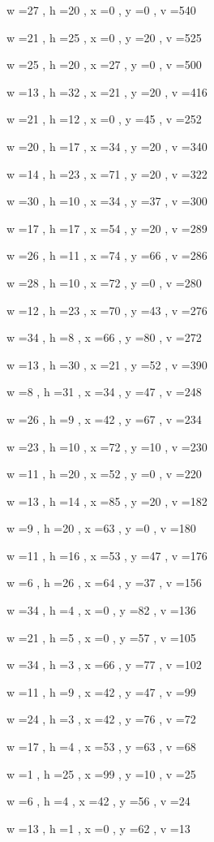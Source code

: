 \documentclass[11pt]{article}
\begin{document}
w =27 , h =20 , x =0 , y =0 , v =540
\par
w =21 , h =25 , x =0 , y =20 , v =525
\par
w =25 , h =20 , x =27 , y =0 , v =500
\par
w =13 , h =32 , x =21 , y =20 , v =416
\par
w =21 , h =12 , x =0 , y =45 , v =252
\par
w =20 , h =17 , x =34 , y =20 , v =340
\par
w =14 , h =23 , x =71 , y =20 , v =322
\par
w =30 , h =10 , x =34 , y =37 , v =300
\par
w =17 , h =17 , x =54 , y =20 , v =289
\par
w =26 , h =11 , x =74 , y =66 , v =286
\par
w =28 , h =10 , x =72 , y =0 , v =280
\par
w =12 , h =23 , x =70 , y =43 , v =276
\par
w =34 , h =8 , x =66 , y =80 , v =272
\par
w =13 , h =30 , x =21 , y =52 , v =390
\par
w =8 , h =31 , x =34 , y =47 , v =248
\par
w =26 , h =9 , x =42 , y =67 , v =234
\par
w =23 , h =10 , x =72 , y =10 , v =230
\par
w =11 , h =20 , x =52 , y =0 , v =220
\par
w =13 , h =14 , x =85 , y =20 , v =182
\par
w =9 , h =20 , x =63 , y =0 , v =180
\par
w =11 , h =16 , x =53 , y =47 , v =176
\par
w =6 , h =26 , x =64 , y =37 , v =156
\par
w =34 , h =4 , x =0 , y =82 , v =136
\par
w =21 , h =5 , x =0 , y =57 , v =105
\par
w =34 , h =3 , x =66 , y =77 , v =102
\par
w =11 , h =9 , x =42 , y =47 , v =99
\par
w =24 , h =3 , x =42 , y =76 , v =72
\par
w =17 , h =4 , x =53 , y =63 , v =68
\par
w =1 , h =25 , x =99 , y =10 , v =25
\par
w =6 , h =4 , x =42 , y =56 , v =24
\par
w =13 , h =1 , x =0 , y =62 , v =13
\par
\newpage
\end{document}
